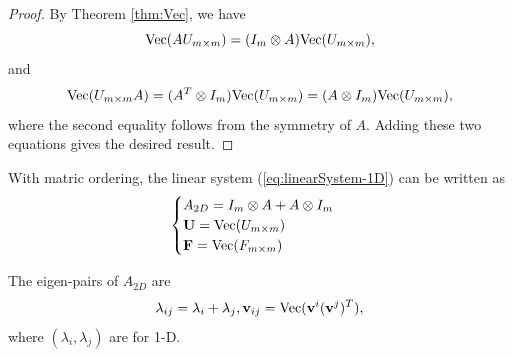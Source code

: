 \begin{proof}
  By Theorem \ref{thm:Vec}, we have
  \begin{equation}
    \textmd{Vec}(AU_{m\times m})=(I_m\otimes A)\textmd{Vec}(U_{m\times m}),
  \end{equation}
  and 
  \begin{equation}
  \textmd{Vec}(U_{m\times m}A)=
  ( A^T\otimes I_m)\textmd{Vec}(U_{m\times m})
  = ( A\otimes I_m)\textmd{Vec}(U_{m\times m}),
\end{equation}
where the second equality follows from the symmetry of $A$.
Adding these two equations gives the desired result.
\end{proof}

\begin{thm}
  With matric ordering,
  the linear system (\ref{eq:linearSystem-1D}) can be written as
  \begin{equation}
    \begin{cases}
      A_{2D}=I_m\otimes A+ A\otimes I_m\\
      \mathbf{U}=\textmd{Vec}(U_{m\times m})\\
      \mathbf{F}=\textmd{Vec}(F_{m\times m})
    \end{cases}
  \end{equation}
\end{thm}

\begin{thm}
  The eigen-pairs of $A_{2D}$ are
  \begin{equation}
    \lambda_{ij}=\lambda_i+\lambda_j,
    \mathbf{v}_{ij}=\textmd{Vec}(\mathbf{v}^i(\mathbf{v}^j)^T),
  \end{equation}
where $(\lambda_i,\lambda_j)$ are for 1-D.
\end{thm}

